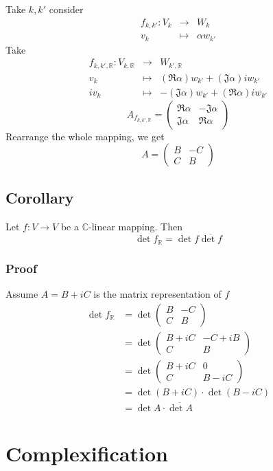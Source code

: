 \documentclass{book}
\begin{document}
Take $k,k'$ consider
$$\begin{aligned}
    f_{k,k'}:V_k&\rightarrow&W_k\\
    v_k&\mapsto&\alpha w_{k'}
\end{aligned}$$
Take $$\begin{aligned}
    f_{k,k',\mathbb{R}}:V_{k,\mathbb{R}}&\rightarrow&W_{k',\mathbb{R}}\\
    v_k&\mapsto&(\mathfrak{R}\alpha)w_{k'}+(\mathfrak{J}\alpha)iw_{k'}\\
    iv_k&\mapsto&-(\mathfrak{J}\alpha)w_{k'}+(\mathfrak{R}\alpha)iw_{k'}
\end{aligned}$$
$$A_{f_{k,k',\mathbb{R}}}=\begin{pmatrix}
    \mathfrak{R}\alpha & -\mathfrak{J}\alpha\\
    \mathfrak{J}\alpha & \mathfrak{R}\alpha
\end{pmatrix}$$
Rearrange the whole mapping, we get$$A=\begin{pmatrix}
    B&-C\\C&B
\end{pmatrix}$$
\section{Corollary}
Let $f:V\rightarrow V$ be a $\mathbb{C}$-linear mapping. Then$$\det f_\mathbb{R}=\det f\overline{\det f}$$
\subsection*{Proof}
Assume $A=B+iC$ is the matrix representation of $f$
$$\begin{aligned}
    \det f_\mathbb{R}&=\det\begin{pmatrix}
        B&-C\\C&B
    \end{pmatrix}\\
    &=\det\begin{pmatrix}
        B+iC&-C+iB\\C&B\end{pmatrix}\\
    &=\det\begin{pmatrix}
        B+iC&0\\C& B-iC\end{pmatrix}\\
    &=\det(B+iC)\cdot\det(B-iC)\\
    &=\det A\cdot\overline{\det A}
\end{aligned}$$
\chapter{Complexification}
\end{document}
